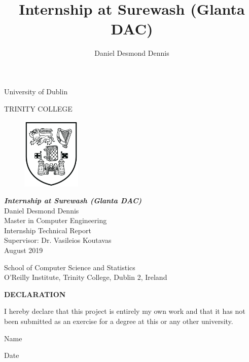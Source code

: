 \begin{center}
    \title{Internship at Surewash (Glanta DAC)}
    \author{Daniel Desmond Dennis}
    {\huge University of Dublin}

    \vspace*{0.5in}
    
    {\Huge TRINITY COLLEGE}

    \vspace*{0.5in}

    \begin{figure}[h]
      \begin{center}
        \includegraphics[width=1.1in]{../img/tcd_old_logo.png}
      \end{center}
    \end{figure}

    

    \vspace*{1.0in}
    {\Large \bfseries \slshape
    Internship at Surewash (Glanta DAC)\\
    }
    \vspace*{1.0in}
    {
    Daniel Desmond Dennis\\
    Master in Computer Engineering\\
    Internship Technical Report\\
    Supervisor: Dr. Vasileios Koutavas\\
    August 2019
    }

    \setcounter{section}{0}

    \vfill

    {\Large
    School of Computer Science and Statistics\\

    O’Reilly Institute, Trinity College, Dublin 2, Ireland
    }

\end{center}

\newpage

\begin{center}
{\bfseries \large DECLARATION}\\
\end{center}
\vspace*{0.5in}
I hereby declare that this project is entirely my own work and that it has not been submitted as an exercise for a degree at this or any other university.
\vspace*{0.5in}

\newcommand*\namefield[2][8cm]{\vspace*{2cm}\parbox{#1}{\hrulefill\par#2}}
\newcommand*\datefield[2][5cm]{\vspace*{2cm}\parbox{#1}{\hrulefill\par#2}}

\begingroup
  \centering
  \namefield{Name}
  \hspace{1cm}
  \datefield{Date}
  \par
\endgroup
